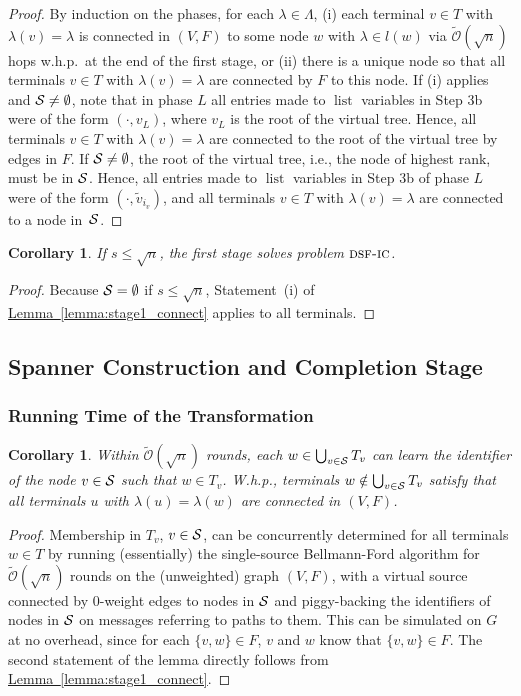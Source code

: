 \documentclass[letterpaper,11pt]{article}
\newtheorem{corollary}[theorem]{Corollary}
\newcommand{\namedref}[2]{\hyperref[#2]{#1~\ref*{#2}}}
\newcommand{\lemmaref}[1]{\namedref{Lemma}{#1}}
\newcommand{\BO}{\mathcal{O}}
\newcommand{\sO}{\tilde{\mathcal{O}}}
\newcommand{\Comp}{\lambda}
\DeclareMathOperator{\unsent}{list}
\newcommand{\sfic}{\textsc{dsf-ic}\xspace}
\begin{document}
\begin{proof}
By induction on the phases, for each $\Comp\in \Lambda$, (i) each terminal $v\in
T$ with $\Comp(v)=\Comp$ is connected in $(V,F)$ to some node $w$ with
$\Comp\in l(w)$ via $\sO(\sqrt{n})$ hops w.h.p.\ at the end of the first
stage, or (ii) there is a unique node so that all terminals $v\in T$ with
$\Comp(v)=\Comp$ are connected by $F$ to this node. If (i) applies and
${\cal S}\neq \emptyset$, note that in phase $L$ all entries made to $\unsent$
variables in Step 3b were of the form $(\cdot,v_L)$, where $v_L$ is the root of
the virtual tree. Hence, all terminals $v\in T$ with $\Comp(v)=\Comp$ are
connected to the root of the virtual tree by edges in $F$. If ${\cal S}\neq
\emptyset$, the root of the virtual tree, i.e., the node of highest rank, must
be in ${\cal S}$. Hence, all entries made to $\unsent$ variables in Step 3b of
phase $L$ were of the form $(\cdot,\tilde{v}_{i_v})$, and all terminals $v\in T$
with $\Comp(v)=\Comp$ are connected to a node in~${\cal S}$.
\end{proof}

\begin{corollary}\label{coro:stage1_smalls_feasible}
If $s\leq \sqrt{n}$, the first stage solves problem $\sfic$.
\end{corollary}
\begin{proof}
Because ${\cal S}=\emptyset$ if $s\leq \sqrt{n}$, Statement~(i) of
\lemmaref{lemma:stage1_connect} applies to all terminals.
\end{proof}

\subsection{Spanner Construction and Completion Stage}\label{sec:spanner}




\subsubsection*{Running Time of the Transformation}
\begin{corollary}\label{coro:stage2_group}
Within $\sO(\sqrt{n})$ rounds, each $w\in \bigcup_{v\in {\cal S}}T_v$ can learn
the identifier of the node $v\in {\cal S}$ such that $w\in T_v$. W.h.p.,
terminals $w\notin \bigcup_{v\in {\cal S}}T_v$ satisfy that all terminals $u$ with
$\Comp(u)=\Comp(w)$ are connected in $(V,F)$.
\end{corollary}
\begin{proof}
Membership in $T_v$, $v\in {\cal S}$, can be concurrently determined for all
terminals $w\in T$ by running (essentially) the single-source Bellmann-Ford
algorithm for $\tilde{\BO}(\sqrt{n})$ rounds on the (unweighted) graph $(V,F)$,
with a virtual source connected by $0$-weight edges to nodes in ${\cal S}$ and
piggy-backing the identifiers of nodes in ${\cal S}$ on messages referring to
paths to them. This can be simulated on $G$ at no overhead, since for each
$\{v,w\}\in F$, $v$ and $w$ know that $\{v,w\}\in F$. The second statement of
the lemma directly follows from \lemmaref{lemma:stage1_connect}.
\end{proof}
\end{document}
